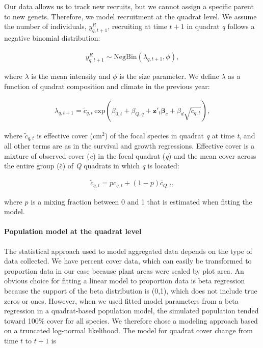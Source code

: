 \documentclass[12pt,]{article}
\let\oldparagraph\paragraph
\renewcommand{\paragraph}[1]{\oldparagraph{#1}\mbox{}}
\begin{document}
Our data allows us to track new recruits, but we cannot assign a
specific parent to new genets. Therefore, we model recruitment at the
quadrat level. We assume the number of individuals, \(y^{R}_{q,t+1}\),
recruiting at time \(t+1\) in quadrat \emph{q} follows a negative
binomial distribution:

\vspace{-3em}\begin{align}
y^{R}_{q,t+1} \sim \text{NegBin}(\lambda_{q,t+1},\phi),
\end{align}\vspace{-3em}

where \(\lambda\) is the mean intensity and \(\phi\) is the size
parameter. We define \(\lambda\) as a function of quadrat composition
and climate in the previous year:

\vspace{-3em}\begin{align}
\lambda_{q,t+1} = \tilde{c}_{q,t} \, \text{exp}\left(\beta_{0,t} + \beta_{Q,q} + \textbf{z}'_t \boldsymbol{\beta}_c + \beta_{d}\sqrt{\tilde{c}_{q,t}}\right),
\end{align}\vspace{-3em}

where \(\tilde{c}_{q,t}\) is effective cover (\(\text{cm}^2\)) of the
focal species in quadrat \emph{q} at time \emph{t}, and all other terms
are as in the survival and growth regressions. Effective cover is a
mixture of observed cover (\emph{c}) in the focal quadrat (\emph{q}) and
the mean cover across the entire group (\(\bar{c}\)) of \emph{Q}
quadrats in which \emph{q} is located:

\vspace{-3em}\begin{align}
\tilde{c}_{q,t} = pc_{q,t} + (1-p)\bar{c}_{Q,t},
\end{align}\vspace{-3em}

where \(p\) is a mixing fraction between 0 and 1 that is estimated when
fitting the model.

\paragraph{Population model at the quadrat
level}\label{population-model-at-the-quadrat-level}

The statistical approach used to model aggregated data depends on the
type of data collected. We have percent cover data, which can easily be
transformed to proportion data in our case because plant areas were
scaled by plot area. An obvious choice for fitting a linear model to
proportion data is beta regression because the support of the beta
distribution is (0,1), which does not include true zeros or ones.
However, when we used fitted model parameters from a beta regression in
a quadrat-based population model, the simulated population tended toward
100\% cover for all species. We therefore chose a modeling approach
based on a truncated log-normal likelihood. The model for quadrat cover
change from time \(t\) to \(t+1\) is
\end{document}
